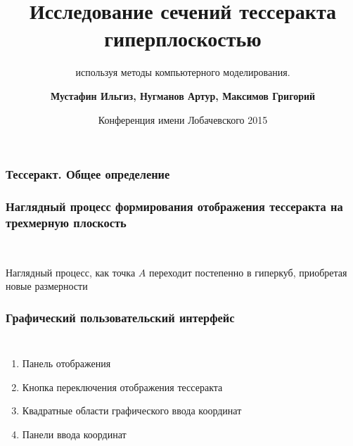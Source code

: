 \documentclass[10pt,pdf,hyperref={unicode}]{beamer}
\title[Математическая модель проекции тессеракта и его сечений гиперплоскостью] %
{ \bfseries Исследование сечений тессеракта гиперплоскостью}
\subtitle{используя методы компьютерного моделирования.}
\author[Мустафин И., Нугманов А., Максимов Г.]
{ \bfseries Мустафин Ильгиз, Нугманов Артур, Максимов Григорий}
\institute[ТТЛ №2] %
{
  \vspace{0.2cm}
  {\bfseries Научный руководитель -- Давлетбаев Марсель Фанилевич} \\
  \vspace{0.2cm}

  { \normalsize МАОУ "Лицей-интернат №2"} \\
  Московского района города Казани
}
\date[2015-03-26] %
{Конференция имени Лобачевского 2015}
\begin{document}
\frame{\titlepage}

\begin{frame}
\frametitle{Тессеракт. Общее определение}
\begin{frame}
\frametitle{Наглядный процесс формирования отображения тессеракта на трехмерную плоскость}
\begin{center}
	 \\
\end{center}
Наглядный процесс, как точка $A$ переходит постепенно в гиперкуб, приобретая новые размерности
\end{frame}


\begin{frame}
	\frametitle{Графический пользовательский интерфейс}
	\begin{columns}
			\begin{enumerate}
				\item Панель отображения
				\item Кнопка переключения отображения тессеракта
				\item Квадратные области графического ввода координат
				\item Панели ввода координат
			\end{enumerate}				
	\end{columns}
\end{frame}


\end{frame}
\end{document}
